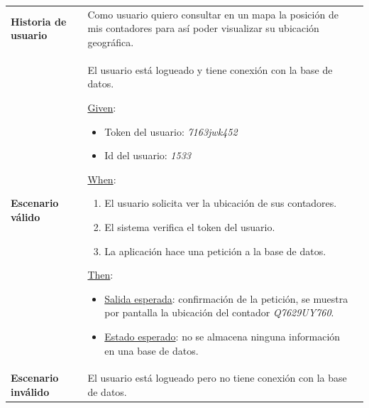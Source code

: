 \documentclass[pdftex,11pt,a4paper]{book}
\begin{document}
\begin{center}
\begin{longtable}{|>{\centering\arraybackslash}X m{2cm}|m{12cm}|}
\hline
\multicolumn{2}{|c|}{\textbf{Prueba de aceptación PA07}}\\
\hline 
\endhead

\textbf{Historia de usuario} & Como usuario quiero consultar en un mapa la posición de mis contadores para así poder visualizar su ubicación geográfica.
\\ \hline

\textbf{Escenario válido} & {\raggedright El usuario está logueado y tiene conexión con la base de datos.\par}
\vspace{2mm}
\break

\underline{Given}:
\begin{itemize}
\addtolength{\itemsep}{-3mm}
\item Token del usuario: \textit{7163jwk452}
\item Id del usuario: \textit{1533}

\end{itemize}
\vspace{3mm}

\underline{When}:
\begin{enumerate}
\vspace{-3mm}
\addtolength{\itemsep}{-3mm}
\item El usuario solicita ver la ubicación de sus contadores.
\item El sistema verifica el token del usuario.
\item La aplicación hace una petición a la base de datos.

\end{enumerate}
\break

\underline{Then}:
\vspace{-3mm}
\begin{itemize}
\addtolength{\itemsep}{-3mm}
\item \underline{Salida esperada}: confirmación de la petición, se muestra por pantalla la ubicación del contador \textit{Q7629UY760}.
\item \underline{Estado esperado}: no se almacena ninguna información en una base de datos.
\end{itemize}


\\ \hline
\textbf{Escenario inválido} & {\raggedright El usuario está logueado pero no tiene conexión con la base de datos.\par}
\vspace{2mm}
\break


\end{longtable}
\end{center}
\end{document}
